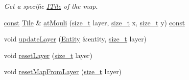 \begin{DoxyCompactItemize}
\begin{DoxyCompactList}\small\item\em Get a specific \hyperlink{classarcade_1_1_i_tile}{I\-Tile} of the map. \end{DoxyCompactList}\item 
\hyperlink{term__entry_8h_a57bd63ce7f9a353488880e3de6692d5a}{const} \hyperlink{classarcade_1_1_tile}{Tile} \& \hyperlink{classarcade_1_1_map_a5b352702cd45feba1dc769feeabf312d}{at\-Mouli} (\hyperlink{nc__alloc_8h_a7b60c5629e55e8ec87a4547dd4abced4}{size\-\_\-t} layer, \hyperlink{nc__alloc_8h_a7b60c5629e55e8ec87a4547dd4abced4}{size\-\_\-t} x, \hyperlink{nc__alloc_8h_a7b60c5629e55e8ec87a4547dd4abced4}{size\-\_\-t} y) \hyperlink{term__entry_8h_a57bd63ce7f9a353488880e3de6692d5a}{const} 
\item 
void \hyperlink{classarcade_1_1_map_a5879a162517bb78cf73c3309bdee0837}{update\-Layer} (\hyperlink{classarcade_1_1_entity}{Entity} \&entity, \hyperlink{nc__alloc_8h_a7b60c5629e55e8ec87a4547dd4abced4}{size\-\_\-t} layer)
\item 
void \hyperlink{classarcade_1_1_map_a1156b5471f3a94a70945f5048a56fc24}{reset\-Layer} (\hyperlink{nc__alloc_8h_a7b60c5629e55e8ec87a4547dd4abced4}{size\-\_\-t} layer)
\item 
void \hyperlink{classarcade_1_1_map_a4e8a5a82574e0dd8db4e1ffc0944d952}{reset\-Map\-From\-Layer} (\hyperlink{nc__alloc_8h_a7b60c5629e55e8ec87a4547dd4abced4}{size\-\_\-t} layer)
\end{DoxyCompactItemize}


